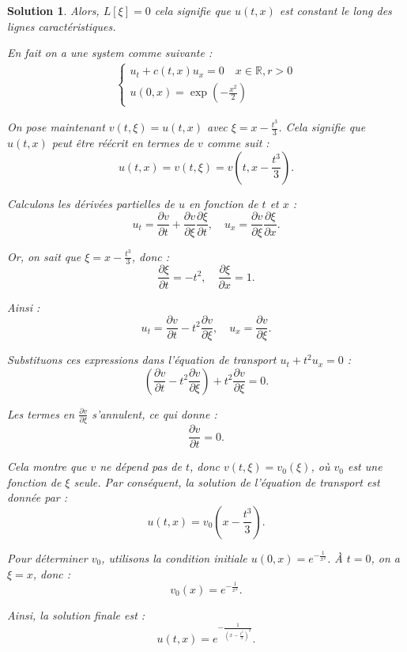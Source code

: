 \documentclass[10pt]{article}
\theoremstyle{frenchstyle}
\newtheorem{solution}{Solution}
\newcommand{\R}{\mathbb{R}}
\begin{document}
\begin{solution}
    Alors, $L[\xi] = 0$ cela signifie que $u(t,x)$ est constant le long des lignes caractéristiques. 

    En fait on a une system comme suivante :
    \begin{align*}
        \begin{cases*}
            u_t + c(t,x)u_x=0 \quad x\in \R, r>0\\
            u(0,x)=\exp(-\frac{x^2}{2})
        \end{cases*}
    \end{align*}

    On pose maintenant $v(t, \xi) = u(t, x)$ avec $\xi = x - \frac{t^3}{3}$. Cela signifie que $u(t, x)$ peut être réécrit en termes de $v$ comme suit :
    \[
    u(t, x) = v(t, \xi) = v\left(t, x - \frac{t^3}{3}\right).
    \]

    Calculons les dérivées partielles de $u$ en fonction de $t$ et $x$ :
    \[
    u_t = \frac{\partial v}{\partial t} + \frac{\partial v}{\partial \xi} \frac{\partial \xi}{\partial t}, \quad u_x = \frac{\partial v}{\partial \xi} \frac{\partial \xi}{\partial x}.
    \]

    Or, on sait que $\xi = x - \frac{t^3}{3}$, donc :
    \[
    \frac{\partial \xi}{\partial t} = -t^2, \quad \frac{\partial \xi}{\partial x} = 1.
    \]

    Ainsi :
    \[
    u_t = \frac{\partial v}{\partial t} - t^2 \frac{\partial v}{\partial \xi}, \quad u_x = \frac{\partial v}{\partial \xi}.
    \]

    Substituons ces expressions dans l'équation de transport $u_t + t^2 u_x = 0$ :
    \[
    \left(\frac{\partial v}{\partial t} - t^2 \frac{\partial v}{\partial \xi}\right) + t^2 \frac{\partial v}{\partial \xi} = 0.
    \]

    Les termes en $\frac{\partial v}{\partial \xi}$ s'annulent, ce qui donne :
    \[
    \frac{\partial v}{\partial t} = 0.
    \]

    Cela montre que $v$ ne dépend pas de $t$, donc $v(t, \xi) = v_0(\xi)$, où $v_0$ est une fonction de $\xi$ seule. Par conséquent, la solution de l'équation de transport est donnée par :
    \[
    u(t, x) = v_0\left(x - \frac{t^3}{3}\right).
    \]

    Pour déterminer $v_0$, utilisons la condition initiale $u(0, x) = e^{-\frac{1}{x^2}}$. À $t = 0$, on a $\xi = x$, donc :
    \[
    v_0(x) = e^{-\frac{1}{x^2}}.
    \]

    Ainsi, la solution finale est :
    \[
    u(t, x) = e^{-\frac{1}{\left(x - \frac{t^3}{3}\right)^2}}.
    \]



\end{solution}
\end{document}
